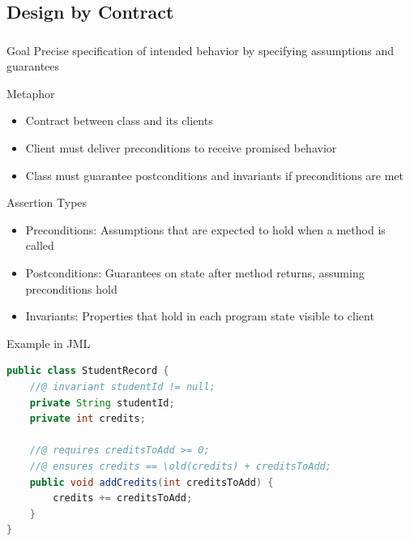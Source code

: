 \subsection{Design by Contract}
\begin{frame}[fragile]
	\frametitle{\insertsubsection}
	\begin{fancycolumns}
		\begin{motivation}{Goal}
			Precise specification of intended behavior by specifying assumptions and guarantees
		\end{motivation}
		\begin{motivation}{Metaphor}
			\begin{itemize}
				\item Contract between class and its clients
				\item Client must deliver preconditions to receive promised behavior
				\item Class must guarantee postconditions and invariants if preconditions are met
			\end{itemize}
		\end{motivation}
		\begin{definition}{\insertsubsection\mysource{\lessonsofariane}}
			\small
		\end{definition}
		\nextcolumn
		\begin{definition}{Assertion Types}
			\begin{itemize}
				\item Preconditions: Assumptions that are expected to hold when a method is called
				\item Postconditions: Guarantees on state after method returns, assuming preconditions hold
				\item Invariants: Properties that hold in each program state visible to client
			\end{itemize}
		\end{definition}
		\begin{example}{Example in JML}
			\vspace{-3mm}
			\begin{lstlisting}[language=Java,basicstyle=\ttfamily\footnotesize]
public class StudentRecord {
	//@ invariant studentId != null;
	private String studentId;
	private int credits;

	//@ requires creditsToAdd >= 0;
	//@ ensures credits == \old(credits) + creditsToAdd;
	public void addCredits(int creditsToAdd) {
		credits += creditsToAdd;
	}
}
			\end{lstlisting}
			\vspace{-3mm}
		\end{example}
	\end{fancycolumns}
\end{frame}

